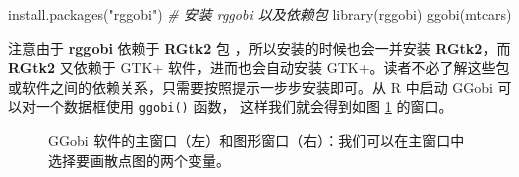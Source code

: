 \documentclass[
  b5paper,
  UTF8,twoside]{book}
\newenvironment{Shaded}{\begin{snugshade}}{\end{snugshade}}
\newcommand{\CommentTok}[1]{\textcolor[rgb]{0.56,0.35,0.01}{\textit{#1}}}
\newcommand{\FunctionTok}[1]{\textcolor[rgb]{0.00,0.00,0.00}{#1}}
\newcommand{\NormalTok}[1]{#1}
\newcommand{\StringTok}[1]{\textcolor[rgb]{0.31,0.60,0.02}{#1}}
\begin{document}
\begin{Shaded}
\begin{Highlighting}[]
\FunctionTok{install.packages}\NormalTok{(}\StringTok{"rggobi"}\NormalTok{) }\CommentTok{\# 安装 rggobi 以及依赖包}
\FunctionTok{library}\NormalTok{(rggobi)}
\FunctionTok{ggobi}\NormalTok{(mtcars)}
\end{Highlighting}
\end{Shaded}

注意由于 \textbf{rggobi} 依赖于 \textbf{RGtk2} 包 \citep{RGtk2}，所以安装的时候也会一并安装 \textbf{RGtk2}，而 \textbf{RGtk2} 又依赖于 GTK+ 软件，进而也会自动安装 GTK+。读者不必了解这些包或软件之间的依赖关系，只需要按照提示一步步安装即可。从 R 中启动 GGobi 可以对一个数据框使用 \texttt{ggobi()} 函数， 这样我们就会得到如图 \ref{fig:GGobi-main-window} 的窗口。

\begin{figure}

{\centering {}

}

\caption[GGobi 软件的主窗口和图形窗口 ]{GGobi 软件的主窗口（左）和图形窗口（右）：我们可以在主窗口中选择要画散点图的两个变量。}\label{fig:GGobi-main-window}
\end{figure}
\end{document}
